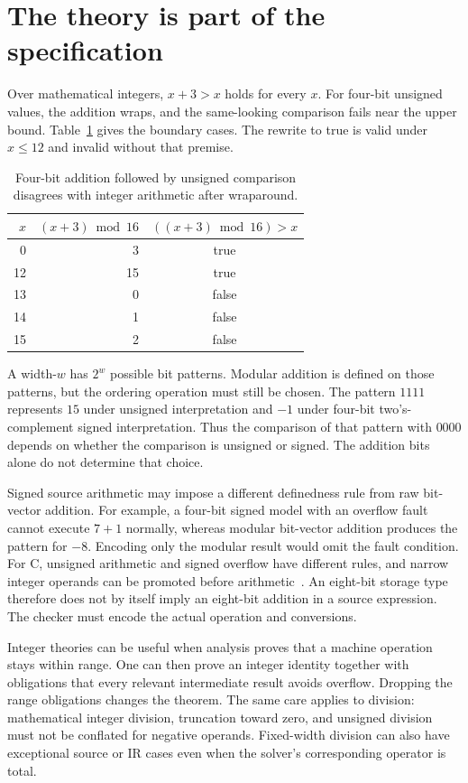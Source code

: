 \section{The theory is part of the specification}
\label{sec:ch41-theories}

Over mathematical integers, $x+3>x$ holds for every $x$.
For four-bit unsigned values, the addition wraps, and the same-looking comparison fails near the upper bound.
Table~\ref{tab:ch41-wrap} gives the boundary cases.
The rewrite to true is valid under $x\leq12$ and invalid without that premise.

\begin{table}
\caption{Four-bit addition followed by unsigned comparison disagrees with integer arithmetic after wraparound.}
\label{tab:ch41-wrap}
\centering
\begin{tabular}{rrc}
\toprule
$x$ & $(x+3)\bmod16$ & $((x+3)\bmod16)>x$ \\
\midrule
0 & 3 & true \\
12 & 15 & true \\
13 & 0 & false \\
14 & 1 & false \\
15 & 2 & false \\
\bottomrule
\end{tabular}
\end{table}

A width-$w$  has $2^w$ possible bit patterns.
Modular addition is defined on those patterns, but the ordering operation must still be chosen.
The pattern $1111$ represents $15$ under unsigned interpretation and $-1$ under four-bit two's-complement signed interpretation.
Thus the comparison of that pattern with $0000$ depends on whether the comparison is unsigned or signed.
The addition bits alone do not determine that choice.

Signed source arithmetic may impose a different definedness rule from raw bit-vector addition.
For example, a four-bit signed model with an overflow fault cannot execute $7+1$ normally, whereas modular bit-vector addition produces the pattern for $-8$.
Encoding only the modular result would omit the fault condition.
For C, unsigned arithmetic and signed overflow have different rules, and narrow integer operands can be promoted before arithmetic~\cite{wg14-2011-c11}.
An eight-bit storage type therefore does not by itself imply an eight-bit addition in a source expression.
The checker must encode the actual operation and conversions.

Integer theories can be useful when analysis proves that a machine operation stays within range.
One can then prove an integer identity together with obligations that every relevant intermediate result avoids overflow.
Dropping the range obligations changes the theorem.
The same care applies to division: mathematical integer division, truncation toward zero, and unsigned division must not be conflated for negative operands.
Fixed-width division can also have exceptional source or IR cases even when the solver's corresponding operator is total.


